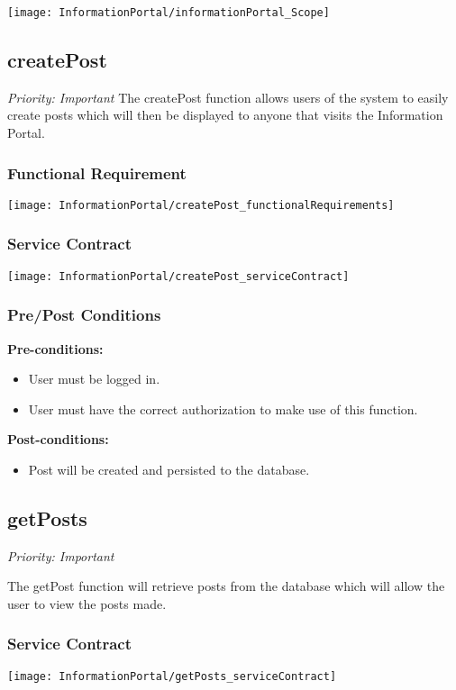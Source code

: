 
\texttt{[image: InformationPortal/informationPortal\_Scope]}

\subsection{createPost}
\textit{Priority: Important}
	The createPost function allows users of the system to easily create posts which will then be displayed to anyone that visits the Information Portal.
	
\subsubsection{Functional Requirement}
\texttt{[image: InformationPortal/createPost\_functionalRequirements]}

\subsubsection{Service Contract}
\texttt{[image: InformationPortal/createPost\_serviceContract]}

\subsubsection{Pre/Post Conditions}
	\textbf{Pre-conditions:}
	\begin{itemize}
		\item User must be logged in.
		\item User must have the correct authorization to make use of this function.
	\end{itemize}
	\textbf{Post-conditions:}
	\begin{itemize}
		\item Post will be created and persisted to the database.
	\end{itemize}

\subsection{getPosts}
\textit{Priority: Important}

The getPost function will retrieve posts from the database which will allow the user to view the posts made.

\subsubsection{Service Contract}
\texttt{[image: InformationPortal/getPosts\_serviceContract]}

